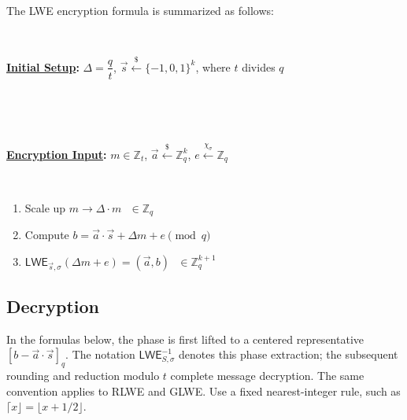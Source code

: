 The LWE encryption formula is summarized as follows:

$ $

\begin{tcolorbox}[title={\textbf{\tboxlabel{\ref*{subsec:lwe-enc}} LWE Encryption}}]
\textbf{\underline{Initial Setup}:} $\Delta = \dfrac{q}{t}$, $\vec{s} \xleftarrow{\$} \{-1, 0, 1\}^k$, where $t$ divides $q$

$ $

$ $

\textbf{\underline{Encryption Input}:} $m \in \mathbb{Z}_t$, $\vec{a} \xleftarrow{\$} \mathbb{Z}_q^k$, $e \xleftarrow{\chi_\sigma} \mathbb{Z}_q$

$ $


\begin{enumerate}
\item Scale up $m \longrightarrow \Delta \cdot m \text{ } \in \mathbb{Z}_q$

\item Compute $b = \vec{a} \cdot \vec{s} + \Delta  m + e \pmod q$
\item $\textsf{LWE}_{\vec{s},\sigma}(\Delta  m + e) = (\vec{a}, b) \text{ } \in \mathbb{Z}_q^{k + 1}$ 
\end{enumerate}

\end{tcolorbox}

\subsection{Decryption}
\label{subsec:lwe-dec}

In the formulas below, the phase is first lifted to a centered representative $[b-\vec a\cdot\vec s]_q$. The notation $\textsf{LWE}^{-1}_{S,\sigma}$ denotes this phase extraction; the subsequent rounding and reduction modulo $t$ complete message decryption. The same convention applies to RLWE and GLWE. Use a fixed nearest-integer rule, such as $\lceil x\rfloor=\lfloor x+1/2\rfloor$.

